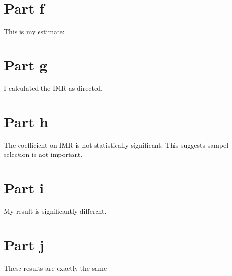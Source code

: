 \documentclass[11pt]{article}
\begin{document}
\section*{Part f}

This is my estimate:
\begin{center}
	
\end{center}


\section*{Part g}

I calculated the IMR as directed.


\section*{Part h}

The coefficient on IMR is not statistically significant. This suggests sampel selection is not important. 

\begin{center}
	
\end{center}


\section*{Part i}
My result is significantly different. 
\begin{center}
	
\end{center}


\section*{Part j}

These results are exactly the same

\begin{center}
	
\end{center}







\end{document}
